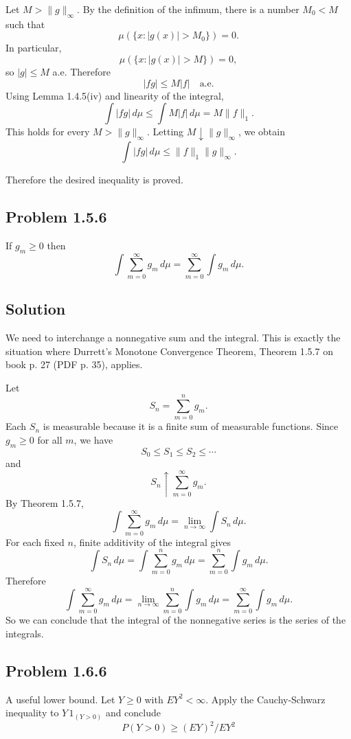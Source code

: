 \documentclass[a4paper,12pt,openany]{article}
\theoremstyle{plain}
\theoremstyle{definition}
\begin{document}
Let $M>\|g\|_\infty$. By the definition of the infimum, there is a number $M_0<M$ such that
\[
\mu(\{x:|g(x)|>M_0\})=0.
\]
In particular,
\[
\mu(\{x:|g(x)|>M\})=0,
\]
so $|g|\le M$ a.e. Therefore
\[
|fg|\le M|f|
\quad\text{a.e.}
\]
Using Lemma 1.4.5(iv) and linearity of the integral,
\[
\int |fg|\,d\mu
\le
\int M|f|\,d\mu
=
M\|f\|_1.
\]
This holds for every $M>\|g\|_\infty$. Letting $M\downarrow \|g\|_\infty$, we obtain
\[
\int |fg|\,d\mu
\le
\|f\|_1\|g\|_\infty.
\]

\medskip

Therefore the desired inequality is proved.

\subsection*{Problem 1.5.6}

If $g_m \ge 0$ then
\[
\int \sum_{m=0}^{\infty} g_m\,d\mu
= \sum_{m=0}^{\infty} \int g_m\,d\mu.
\]

\subsection*{Solution}

We need to interchange a nonnegative sum and the integral. This is exactly the situation where Durrett's Monotone Convergence Theorem, Theorem 1.5.7 on book p. 27 (PDF p. 35), applies.

\medskip

Let
\[
S_n=\sum_{m=0}^{n}g_m.
\]
Each $S_n$ is measurable because it is a finite sum of measurable functions.
Since $g_m\ge 0$ for all $m$, we have
\[
S_0\le S_1\le S_2\le\cdots
\]
and
\[
S_n\uparrow \sum_{m=0}^{\infty}g_m.
\]
By Theorem 1.5.7,
\[
\int \sum_{m=0}^{\infty}g_m\,d\mu
=
\lim_{n\to\infty}\int S_n\,d\mu.
\]
For each fixed $n$, finite additivity of the integral gives
\[
\int S_n\,d\mu
=
\int \sum_{m=0}^{n}g_m\,d\mu
=
\sum_{m=0}^{n}\int g_m\,d\mu.
\]
Therefore
\[
\int \sum_{m=0}^{\infty}g_m\,d\mu
=
\lim_{n\to\infty}\sum_{m=0}^{n}\int g_m\,d\mu
=
\sum_{m=0}^{\infty}\int g_m\,d\mu.
\]
So we can conclude that the integral of the nonnegative series is the series of the integrals.

\subsection*{Problem 1.6.6}

A useful lower bound. Let $Y \ge 0$ with $EY^2 < \infty$. Apply the Cauchy-Schwarz inequality to $Y\,1_{(Y>0)}$ and conclude
\[
P(Y > 0) \ge (EY)^2/EY^2
\]
\end{document}

